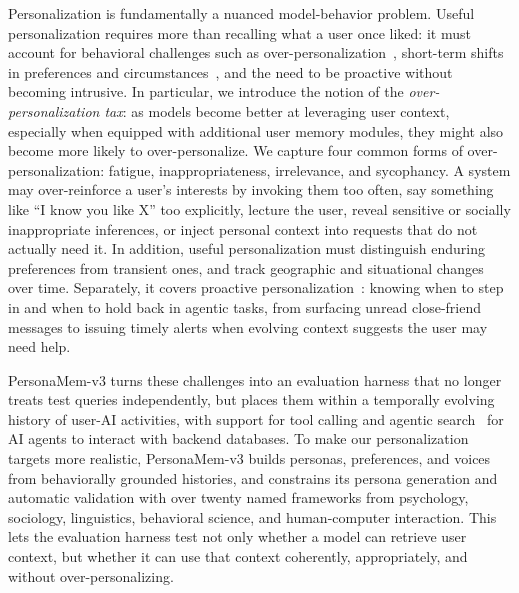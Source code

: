 \documentclass[]{fairmeta}
\begin{document}
Personalization is fundamentally a nuanced model-behavior problem. Useful personalization requires more than recalling what a user once liked: it must account for behavioral challenges such as over-personalization~\citep{hu2026op, spadea2025avoiding}, short-term shifts in preferences and circumstances~\citep{jiang2025know, jiang2025personamem}, and the need to be proactive without becoming intrusive. In particular, we introduce the notion of the \textit{over-personalization tax}: as models become better at leveraging user context, especially when equipped with additional user memory modules, they might also become more likely to over-personalize. We capture four common forms of over-personalization: fatigue, inappropriateness, irrelevance, and sycophancy. A system may over-reinforce a user’s interests by invoking them too often, say something like ``I know you like X'' too explicitly, lecture the user, reveal sensitive or socially inappropriate inferences, or inject personal context into requests that do not actually need it. In addition, useful personalization must distinguish enduring preferences from transient ones, and track geographic and situational changes over time. Separately, it covers proactive personalization~\citep{chen2026vitabench2, lu2025proactiveagent, yang2025contextagent, sun2025training, tang2026proagentbench, zhang2026pibench}: knowing when to step in and when to hold back in agentic tasks, from surfacing unread close-friend messages to issuing timely alerts when evolving context suggests the user may need help.

PersonaMem-v3 turns these challenges into an evaluation harness that no longer treats test queries independently, but places them within a temporally evolving history of user-AI activities, with support for tool calling and agentic search~\citep{anthropic2026claudecodetools} for AI agents to interact with backend databases. To make our personalization targets more realistic, PersonaMem-v3 builds personas, preferences, and voices from behaviorally grounded histories, and constrains its persona generation and automatic validation with over twenty named frameworks from psychology, sociology, linguistics, behavioral science, and human-computer interaction. This lets the evaluation harness test not only whether a model can retrieve user context, but whether it can use that context coherently, appropriately, and without over-personalizing.
\end{document}
